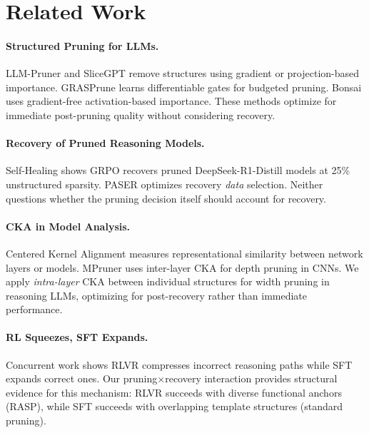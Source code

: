 \documentclass[11pt,a4paper]{article}
\newcommand{\method}{RASP}
\begin{document}
\section{Related Work}
\label{sec:related}

\paragraph{Structured Pruning for LLMs.}
LLM-Pruner \cite{llmpruner2023} and SliceGPT \cite{slicegpt2024} remove structures using gradient or projection-based importance. GRASPrune \cite{graspprune2026} learns differentiable gates for budgeted pruning. Bonsai \cite{bonsai2025} uses gradient-free activation-based importance. These methods optimize for immediate post-pruning quality without considering recovery.

\paragraph{Recovery of Pruned Reasoning Models.}
Self-Healing \cite{selfhealing2025} shows GRPO recovers pruned DeepSeek-R1-Distill models at 25\% unstructured sparsity. PASER \cite{paser2025} optimizes recovery \emph{data} selection. Neither questions whether the pruning decision itself should account for recovery.

\paragraph{CKA in Model Analysis.}
Centered Kernel Alignment \cite{kornblith2019cka} measures representational similarity between network layers or models. MPruner \cite{mpruner2024} uses inter-layer CKA for depth pruning in CNNs. We apply \emph{intra-layer} CKA between individual structures for width pruning in reasoning LLMs, optimizing for post-recovery rather than immediate performance.

\paragraph{RL Squeezes, SFT Expands.}
Concurrent work \cite{rlsqueezes2026} shows RLVR compresses incorrect reasoning paths while SFT expands correct ones. Our pruning$\times$recovery interaction provides structural evidence for this mechanism: RLVR succeeds with diverse functional anchors (\method{}), while SFT succeeds with overlapping template structures (standard pruning).
\end{document}

